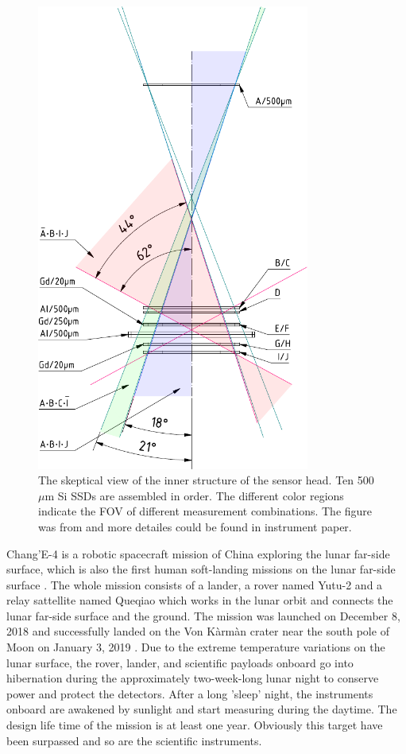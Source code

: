 \begin{figure}
    \centering
    \includegraphics[width = 0.8\textwidth]{images/change4_lnd-c9_trigger-cones-colored.pdf}
    \caption[The inner structure of LND sensor head]{The skeptical view of the inner structure of the sensor head. Ten 500 $\mu$m Si \acp{SSD} are assembled in order. The different color regions indicate the \ac{FOV} of different measurement combinations. The figure was from \citet{Wimmer-2020-LND} and more detailes could be found in instrument paper.}
    \label{Fig:LND_sensor_head}
\end{figure}
Chang'E-4 is a robotic spacecraft mission of China exploring the lunar far-side surface, which is also the first human soft-landing missions on the lunar far-side surface \citep{Li2021SSRv}. The whole mission consists of a lander, a rover named Yutu-2 and a relay sattellite named Queqiao which works in the lunar orbit and connects the lunar far-side surface and the ground. The mission was launched on December 8, 2018 and successfully landed on the Von K\`arm\`an crater near the south pole of Moon on January 3, 2019 \citep{Wu2019NatGe}. Due to the extreme temperature variations on the lunar surface, the rover, lander, and scientific payloads onboard go into hibernation during the approximately two-week-long lunar night to conserve power and protect the detectors.  After a long 'sleep' night, the instruments onboard are awakened by sunlight and start measuring during the daytime. The design life time of the mission is at least one year. Obviously this target have been surpassed and so are the scientific instruments.

